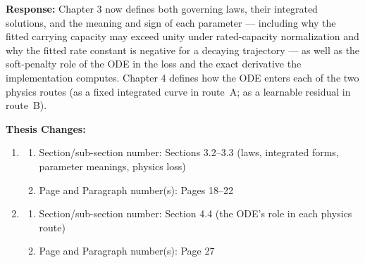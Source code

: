 \documentclass[12pt,a4paper]{article}
\begin{document}
\vspace{\baselineskip}

\textbf{Response:} Chapter 3 now defines both governing laws, their integrated
solutions, and the meaning and sign of each parameter --- including why the
fitted carrying capacity may exceed unity under rated-capacity normalization
and why the fitted rate constant is negative for a decaying trajectory --- as
well as the soft-penalty role of the ODE in the loss and the exact derivative
the implementation computes. Chapter 4 defines how the ODE enters each of the
two physics routes (as a fixed integrated curve in route~A; as a learnable
residual in route~B).

\vspace{\baselineskip}

\textbf{Thesis Changes:}

\begin{enumerate}
    \item
    \begin{enumerate}
        \item Section/sub-section number: Sections 3.2--3.3 (laws, integrated forms, parameter meanings, physics loss)
        \item Page and Paragraph number(s): Pages 18--22
    \end{enumerate}
    \item
    \begin{enumerate}
        \item Section/sub-section number: Section 4.4 (the ODE's role in each physics route)
        \item Page and Paragraph number(s): Page 27
    \end{enumerate}
\end{enumerate}

\vspace{\baselineskip}
\end{document}
